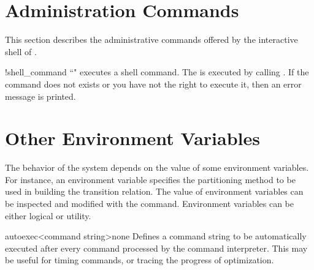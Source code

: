 



\section{Administration Commands}
\label{administration commands}

This section describes the administrative commands offered by the
interactive shell of \nusmv.

\begin{nusmvCommand}{!}{shell\_command}
``\command{!}" executes a shell command. The  is
executed by calling . If the command
does not exists or you have not the right to execute it, then an error
message is printed.
\end{nusmvCommand}













\newpage






\section{Other Environment Variables}
\label{Shell configuration Variables}
%
The behavior of the system depends on the value of some environment
variables. For instance, an environment variable specifies the
partitioning method to be used in building the transition relation.  The
value of environment variables can be inspected and modified with the
 command. Environment variables can be either logical
or utility.

\begin{nusmvVar} {autoexec}{<command string>}{none}
Defines a command string to be automatically executed after every
command processed by the command interpreter. This may be useful for
timing commands, or tracing the progress of optimization.
\end{nusmvVar}

